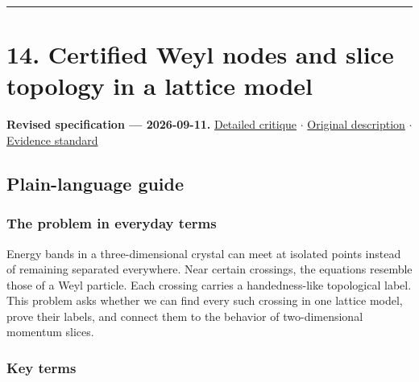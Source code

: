 \documentclass[
  11pt,
]{article}
\begin{document}
\begin{center}\rule{0.5\linewidth}{0.5pt}\end{center}

\section{14. Certified Weyl nodes and slice topology in a lattice model}

\textbf{Revised specification --- 2026-09-11.}
\href{https://github.com/rick-stevens-ai/Pure-Thought/blob/main/reviews/14-Topological-Semimetals-Weyl-Dirac.md}{Detailed
critique} \ensuremath{\cdot}
\href{https://github.com/rick-stevens-ai/Pure-Thought/blob/main/archive/original-PRDs/14-Topological-Semimetals-Weyl-Dirac.md}{Original
description} \ensuremath{\cdot}
\href{https://github.com/rick-stevens-ai/Pure-Thought/blob/main/reviews/EVIDENCE-STANDARD.md}{Evidence
standard}

\subsection{Plain-language guide}

\subsubsection{The problem in everyday terms}

Energy bands in a three-dimensional crystal can meet at isolated points
instead of remaining separated everywhere. Near certain crossings, the
equations resemble those of a Weyl particle. Each crossing carries a
handedness-like topological label. This problem asks whether we can find
every such crossing in one lattice model, prove their labels, and
connect them to the behavior of two-dimensional momentum slices.

\subsubsection{Key terms}
\end{document}
